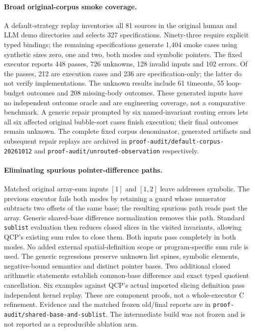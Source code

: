 \paragraph{Broad original-corpus smoke coverage.}
A default-strategy replay inventories all 81 sources in the original human
and LLM demo directories and selects 327 specifications. Ninety-three require
explicit typed bindings; the remaining specifications generate 1,404 smoke
cases using synthetic sizes zero, one and two, both modes and symbolic
pointers. The fixed executor reports 448 passes, 726 unknowns, 128 invalid
inputs and 102 errors. Of the passes, 212 are execution cases and 236 are
specification-only; the latter do not verify implementations. The unknown
results include 61 timeouts, 55 loop-budget outcomes and 208 missing-body
outcomes. These generated inputs have no independent outcome oracle and are
engineering coverage, not a comparative benchmark. A generic repair prompted
by six named-invariant routing errors lets all six affected original
bubble-sort cases finish execution; their final outcomes remain unknown.
The complete fixed corpus denominator, generated artifacts and subsequent
repair replays are archived in \texttt{proof-audit/default-corpus-20261012}
and \texttt{proof-audit/unrouted-observation} respectively.

\paragraph{Eliminating spurious pointer-difference paths.}
Matched original array-sum inputs $[1]$ and $[1,2]$ leave addresses symbolic.
The previous executor fails both modes by retaining a guard whose numerator
subtracts two offsets of the same base; the resulting spurious path reads
past the array. Generic shared-base difference normalization removes this
path. Standard \texttt{sublist} evaluation then reduces closed slices in the
visited invariants, allowing QCP's existing sum rules to close them. Both
inputs pass completely in both modes. No added external spatial-definition
scope or program-specific sum rule is used. The generic regressions preserve
unknown list spines, symbolic elements, negative-bound semantics and distinct
pointer bases. Two additional closed arithmetic statements establish
common-base difference and exact typed quotient cancellation. Six examples
against QCP's actual imported slicing definition pass independent kernel
replay. These are component proofs, not a whole-executor C refinement.
Evidence and the matched frozen old/final reports are in
\texttt{proof-audit/shared-base-and-sublist}. The intermediate build was not
frozen and is not reported as a reproducible ablation arm.

